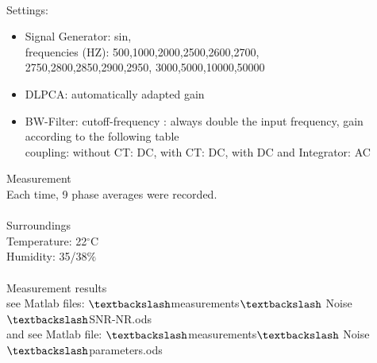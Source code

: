 \\
{\Large Settings:} \newline
\begin{itemize}
\item Signal Generator:  sin,\\
frequencies (HZ): 500,1000,2000,2500,2600,2700,\\
2750,2800,2850,2900,2950, 3000,5000,10000,50000
\item DLPCA:  automatically adapted gain
\item BW-Filter:  cutoff-frequency : always double the input frequency, gain according to the following table\\ coupling: without CT: DC, with CT: DC, with DC and Integrator: AC
\end{itemize}
{\Large Measurement} \\
Each time, 9 phase averages were recorded. \\
\\
{\Large Surroundings} \\
Temperature:  22$^{\circ}$C\\
Humidity: 35/38$\%$\\
\\
{\Large Measurement results}\\
see Matlab files: $\textbackslash$measurements$\textbackslash$ Noise$\textbackslash$SNR-NR.ods\\
and see Matlab file: $\textbackslash$measurements$\textbackslash$ Noise$\textbackslash$parameters.ods
